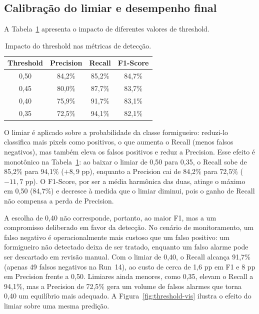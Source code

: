 \documentclass[10pt,a4paper,twocolumn]{article}
\begin{document}
\subsection{Calibração do limiar e desempenho final}

A Tabela~\ref{tab:threshold} apresenta o impacto de diferentes valores de threshold.

\begin{table}[H]
\centering
\caption{Impacto do threshold nas métricas de detecção.}
\label{tab:threshold}
\begin{tabular}{cccc}
\toprule
Threshold & Precision & Recall & F1-Score \\
\midrule
0,50 & 84,2\% & 85,2\% & 84,7\% \\
0,45 & 80,0\% & 87,7\% & 83,7\% \\
0,40 & 75,9\% & 91,7\% & 83,1\% \\
0,35 & 72,5\% & 94,1\% & 82,1\% \\
\bottomrule
\end{tabular}
\end{table}

O limiar é aplicado sobre a probabilidade da classe formigueiro: reduzi-lo classifica mais pixels como positivos, o que aumenta o Recall (menos falsos negativos), mas também eleva os falsos positivos e reduz a Precision. Esse efeito é monotônico na Tabela~\ref{tab:threshold}: ao baixar o limiar de 0,50 para 0,35, o Recall sobe de 85,2\% para 94,1\% ($+8{,}9$ pp), enquanto a Precision cai de 84,2\% para 72,5\% ($-11{,}7$ pp). O F1-Score, por ser a média harmônica das duas, atinge o máximo em 0,50 (84,7\%) e decresce à medida que o limiar diminui, pois o ganho de Recall não compensa a perda de Precision.

A escolha de 0,40 não corresponde, portanto, ao maior F1, mas a um compromisso deliberado em favor da detecção. No cenário de monitoramento, um falso negativo é operacionalmente mais custoso que um falso positivo: um formigueiro não detectado deixa de ser tratado, enquanto um falso alarme pode ser descartado em revisão manual. Com o limiar de 0,40, o Recall alcança 91,7\% (apenas 49 falsos negativos na Run~14), ao custo de cerca de 1,6 pp em F1 e 8 pp em Precision frente a 0,50. Limiares ainda menores, como 0,35, elevam o Recall a 94,1\%, mas a Precision de 72,5\% gera um volume de falsos alarmes que torna 0,40 um equilíbrio mais adequado. A Figura~\ref{fig:threshold-vis} ilustra o efeito do limiar sobre uma mesma predição.
\end{document}
